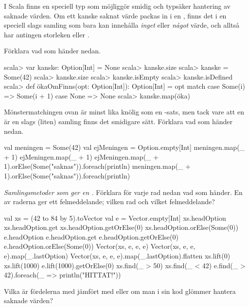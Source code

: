 I Scala finns en speciell typ  som möjliggör smidig och typsäker hantering av saknade värden. Om ett kanske saknat värde packas in i en  , finns det i en speciell slags samling som bara kan innehålla \emph{inget} eller \emph{något} värde, och alltså har antingen storleken  eller .    

\Subtask Förklara vad som händer nedan.
\begin{REPL}
scala> var kanske: Option[Int] = None
scala> kanske.size
scala> kanske = Some(42)
scala> kanske.size
scala> kanske.isEmpty
scala> kanske.isDefined
scala> def ökaOmFinns(opt: Option[Int]): Option[Int] = opt match {
         case Some(i) => Some(i + 1)
         case None    => None
       }
scala> kanske.map(öka)       
\end{REPL}

\Subtask Mönstermatchingen ovan är minst lika knölig som en -sats, men tack vare att en  är en slags (liten) samling finns det smidigare sätt. Förklara vad som händer nedan.
\begin{REPL}
val meningen = Some(42)
val ejMeningen = Option.empty[Int]
meningen.map(_ + 1)
ejMeningen.map(_ + 1)
ejMeningen.map(_ + 1).orElse(Some("saknas")).foreach(println)
meningen.map(_ + 1).orElse(Some("saknas")).foreach(println)
\end{REPL}

\Subtask \emph{Samlingsmetoder som ger en .} Förklara för varje rad nedan vad som händer. En av raderna ger ett felmeddelande; vilken rad och vilket felmeddelande?
\begin{REPL}
val xs = (42 to 84 by 5).toVector
val e = Vector.empty[Int]
xs.headOption
xs.headOption.get
xs.headOption.getOrElse(0)
xs.headOption.orElse(Some(0))
e.headOption
e.headOption.get
e.headOption.getOrElse(0)
e.headOption.orElse(Some(0))
Vector(xs, e, e, e)
Vector(xs, e, e, e).map(_.lastOption)
Vector(xs, e, e, e).map(_.lastOption).flatten
xs.lift(0)
xs.lift(1000)
e.lift(1000).getOrElse(0)
xs.find(_ > 50)
xs.find(_ < 42)
e.find(_ > 42).foreach(_ => println("HITTAT!"))
\end{REPL}

\Subtask\Pen Vilka är fördelerna med  jämfört med  eller  om man i sin kod glömmer hantera saknade värden?
\\ {\color{red}{TODO: Till facit: något i stil med: kompileringsfel vs körtidsfel + dokumentation av returvärden i funktioner direkt i kod istf i kommentarer. Vad menas med ''typsäker''?}}

